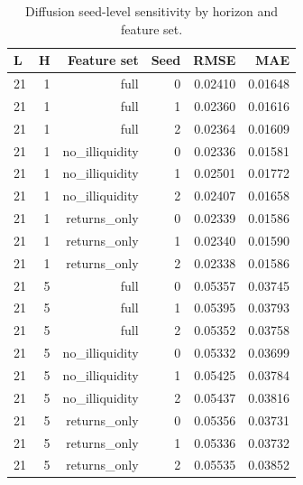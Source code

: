 \begin{table}[!htbp]
\centering
\caption{Diffusion seed-level sensitivity by horizon and feature set.}
\label{tab:diffusion-seed-sensitivity}
\begin{tabular}{lrrrrr}
\toprule
L & H & Feature set & Seed & RMSE & MAE \\
\midrule
21 & 1 & full & 0 & 0.02410 & 0.01648 \\
21 & 1 & full & 1 & 0.02360 & 0.01616 \\
21 & 1 & full & 2 & 0.02364 & 0.01609 \\
21 & 1 & no\_illiquidity & 0 & 0.02336 & 0.01581 \\
21 & 1 & no\_illiquidity & 1 & 0.02501 & 0.01772 \\
21 & 1 & no\_illiquidity & 2 & 0.02407 & 0.01658 \\
21 & 1 & returns\_only & 0 & 0.02339 & 0.01586 \\
21 & 1 & returns\_only & 1 & 0.02340 & 0.01590 \\
21 & 1 & returns\_only & 2 & 0.02338 & 0.01586 \\
21 & 5 & full & 0 & 0.05357 & 0.03745 \\
21 & 5 & full & 1 & 0.05395 & 0.03793 \\
21 & 5 & full & 2 & 0.05352 & 0.03758 \\
21 & 5 & no\_illiquidity & 0 & 0.05332 & 0.03699 \\
21 & 5 & no\_illiquidity & 1 & 0.05425 & 0.03784 \\
21 & 5 & no\_illiquidity & 2 & 0.05437 & 0.03816 \\
21 & 5 & returns\_only & 0 & 0.05356 & 0.03731 \\
21 & 5 & returns\_only & 1 & 0.05336 & 0.03732 \\
21 & 5 & returns\_only & 2 & 0.05535 & 0.03852 \\
\bottomrule
\end{tabular}
\end{table}
